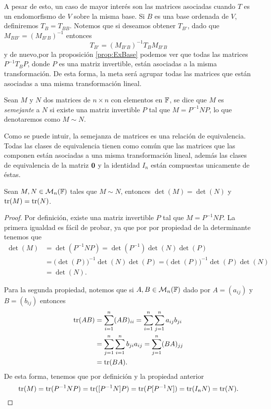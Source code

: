 A pesar de esto, un caso de mayor interés son las matrices asociadas cuando $T$ es un endomorfismo de $V$ sobre la misma base. Si $B$ es una base ordenada de $V$, definiremos $T_B = T_{BB}$. Notemos que si deseamos obtener $T_{B'}$, dado que $M_{BB'} = (M_{B'B})^{-1}$ entonces 
  \[ T_{B'} = (M_{B'B})^{-1} T_B M_{B'B} \]
y de nuevo,por la proposición \ref{prop:ExBase} podemos ver que todas las matrices $P^{-1}T_{B}P$, donde $P$ es una matriz invertible, están asociadas a la misma transformación. De esta forma, la meta será agrupar todas las matrices que están asociadas a una misma transformación lineal.

\begin{defi}
  Sean $M$ y $N$ dos matrices de $n \times n$ con elementos en $\mathbb{F}$, se dice que $M$ es \emph{semejante} a $N$ si existe una matriz invertible $P$ tal que $M = P^{-1}NP$, lo que denotaremos como $M \sim N$.
\end{defi}

Como se puede intuir, la semejanza de matrices es una relación de equivalencia. Todas las clases de equivalencia tienen como común que las matrices que las componen están asociadas a una misma transformación lineal, además las clases de equivalencia de la matriz $\mathbf{0}$ y la identidad $I_n$ están compuestas unicamente de éstas. 

\begin{prop} \label{prop:invdetytr}
  Sean $M,N \in \mathcal{M}_n(\mathbb{F})$ tales que $M \sim N$, entonces $\det(M) = \det(N)$ y $\operatorname{tr}(M) = \operatorname{tr}(N)$.
\end{prop}
\begin{proof}
  Por definición, existe una matriz invertible $P$ tal que $M = P^{-1}NP$. La primera igualdad es fácil de probar, ya que por por propiedad de la determinante tenemos  que
  \begin{align*}
    \det(M) &= \det(P^{-1}NP) = \det(P^{-1})\det(N) \det(P)  \\
      &= \bigl(\det(P)\bigr)^{-1} \det(N) \det(P) = \bigl(\det(P)\bigr)^{-1}\det(P)\det(N)  \\
      &= \det(N).
  \end{align*}
  
  Para la segunda propiedad, notemos que si $A,B \in \mathcal{M}_n(\mathbb{F})$ dado por $A = (a_{ij})$ y $B = (b_{ij})$ entonces
  \begin{align*}
    \operatorname{tr}(AB) &= \sum_{i=1}^n (AB)_{ii} = \sum_{i=1}^n \sum_{j=1}^n a_{ij} b_{ji} \\
      &=  \sum_{j=1}^n \sum_{i=1}^n b_{ji} a_{ij} = \sum_{j=1}^n (BA)_{jj} \\
      &= \operatorname{tr}(BA).
  \end{align*}
  De esta forma, tenemos que por definición y la propiedad anterior
  \[ \operatorname{tr}(M) = \operatorname{tr}(P^{-1}NP) = \operatorname{tr}([P^{-1}N]P) = \operatorname{tr}(P[P^{-1}N]) = \operatorname{tr}(I_n N) = \operatorname{tr}(N). \]
\end{proof}

